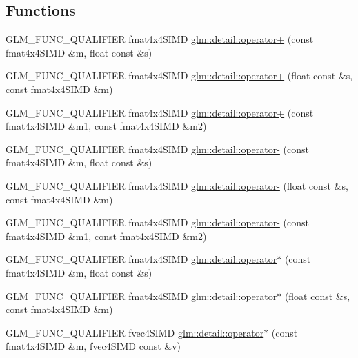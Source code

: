 \subsection*{Functions}
\begin{DoxyCompactItemize}
\item 
G\+L\+M\+\_\+\+F\+U\+N\+C\+\_\+\+Q\+U\+A\+L\+I\+F\+I\+E\+R fmat4x4\+S\+I\+M\+D \hyperlink{namespaceglm_1_1detail_a629935a47dc01b2cd4aa5598f364e359}{glm\+::detail\+::operator+} (const fmat4x4\+S\+I\+M\+D \&m, float const \&s)
\item 
G\+L\+M\+\_\+\+F\+U\+N\+C\+\_\+\+Q\+U\+A\+L\+I\+F\+I\+E\+R fmat4x4\+S\+I\+M\+D \hyperlink{namespaceglm_1_1detail_a4b632f8b13f05642eea7d551815f0923}{glm\+::detail\+::operator+} (float const \&s, const fmat4x4\+S\+I\+M\+D \&m)
\item 
G\+L\+M\+\_\+\+F\+U\+N\+C\+\_\+\+Q\+U\+A\+L\+I\+F\+I\+E\+R fmat4x4\+S\+I\+M\+D \hyperlink{namespaceglm_1_1detail_a9f20d29252cc62031ba3b05aff1d2fe8}{glm\+::detail\+::operator+} (const fmat4x4\+S\+I\+M\+D \&m1, const fmat4x4\+S\+I\+M\+D \&m2)
\item 
G\+L\+M\+\_\+\+F\+U\+N\+C\+\_\+\+Q\+U\+A\+L\+I\+F\+I\+E\+R fmat4x4\+S\+I\+M\+D \hyperlink{namespaceglm_1_1detail_aab9939909f4d23c042e7d438dda5caca}{glm\+::detail\+::operator-\/} (const fmat4x4\+S\+I\+M\+D \&m, float const \&s)
\item 
G\+L\+M\+\_\+\+F\+U\+N\+C\+\_\+\+Q\+U\+A\+L\+I\+F\+I\+E\+R fmat4x4\+S\+I\+M\+D \hyperlink{namespaceglm_1_1detail_a470e32d5d0337f7714ecb8c8c9ad368d}{glm\+::detail\+::operator-\/} (float const \&s, const fmat4x4\+S\+I\+M\+D \&m)
\item 
G\+L\+M\+\_\+\+F\+U\+N\+C\+\_\+\+Q\+U\+A\+L\+I\+F\+I\+E\+R fmat4x4\+S\+I\+M\+D \hyperlink{namespaceglm_1_1detail_a00972f91f088e7ab0f96ebdc6e8bec41}{glm\+::detail\+::operator-\/} (const fmat4x4\+S\+I\+M\+D \&m1, const fmat4x4\+S\+I\+M\+D \&m2)
\item 
G\+L\+M\+\_\+\+F\+U\+N\+C\+\_\+\+Q\+U\+A\+L\+I\+F\+I\+E\+R fmat4x4\+S\+I\+M\+D \hyperlink{namespaceglm_1_1detail_a56fc3932025be61fb9a7cb14005c0d00}{glm\+::detail\+::operator$\ast$} (const fmat4x4\+S\+I\+M\+D \&m, float const \&s)
\item 
G\+L\+M\+\_\+\+F\+U\+N\+C\+\_\+\+Q\+U\+A\+L\+I\+F\+I\+E\+R fmat4x4\+S\+I\+M\+D \hyperlink{namespaceglm_1_1detail_a8ab387a0948c211143bbb41dd8fda30c}{glm\+::detail\+::operator$\ast$} (float const \&s, const fmat4x4\+S\+I\+M\+D \&m)
\item 
G\+L\+M\+\_\+\+F\+U\+N\+C\+\_\+\+Q\+U\+A\+L\+I\+F\+I\+E\+R fvec4\+S\+I\+M\+D \hyperlink{namespaceglm_1_1detail_a8ba6a9d268faa4277d6734a2da036c4d}{glm\+::detail\+::operator$\ast$} (const fmat4x4\+S\+I\+M\+D \&m, fvec4\+S\+I\+M\+D const \&v)

\end{DoxyCompactItemize}
